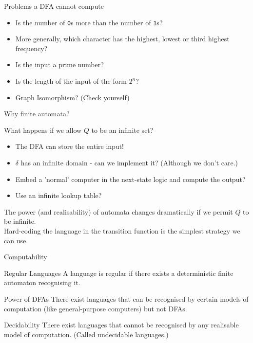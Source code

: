\documentclass{beamer}
\begin{document}
\begin{frame}{Problems a DFA cannot compute}
\begin{itemize}
    \item Is the number of \texttt{0}s more than the number of \texttt{1}s?
    \item More generally, which character has the highest, lowest or third highest frequency?
    \item Is the input a prime number?
    \item Is the length of the input of the form \(2^n\)?
    \item Graph Isomorphism? (Check yourself)
\end{itemize}
\end{frame}
\begin{frame}{Why finite automata?}
\begin{block} {What happens if we allow \(Q\) to be an infinite set?}\pause
\begin{itemize}
    \item The DFA can store the entire input!\pause
    \item \( \delta\) has an infinite domain - can we implement it? (Although we don't care.)
    \item Embed a 'normal' computer in the next-state logic and compute the output?
    \item Use an infinite lookup table?
\end{itemize}
\end{block}
\pause
The power (and realisability) of automata changes dramatically if we permit \(Q\) to be infinite.\\
Hard-coding the language in the transition function is the simplest strategy we can use.
\end{frame}
\begin{frame}{Computability}
    \begin{block}{Regular Languages}
        A language is regular if there exists a deterministic finite automaton recognising it.
    \end{block}
    \pause
    \begin{alertblock}{Power of DFAs}
        There exist languages that can be recognised by certain models of computation (like general-purpose computers) but not DFAs.
    \end{alertblock}
    \pause
    \begin{alertblock}{Decidability}
        There exist languages that cannot be recognised by any realisable model of computation. (Called undecidable languages.)
    \end{alertblock}
\end{frame}
\end{document}
